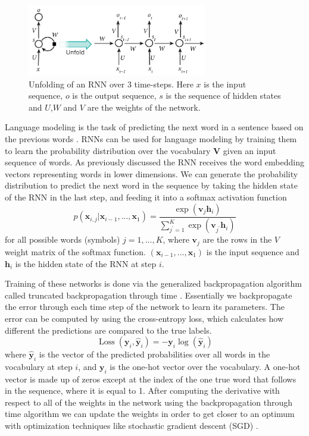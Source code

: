 \documentclass[12pt]{article}
\DeclareMathOperator{\Loss}{Loss}
\begin{document}
\begin{figure}[H]
	\centering
	\includegraphics[width=0.7\textwidth]{pics/rnn.jpg}
	\caption{Unfolding of an RNN over 3 time-steps. Here \(x\) is the input sequence, \(o\) is the output sequence, \(s\) is the sequence of hidden states and \(U\),\(W\) and \(V\) are the weights of the network. \cite{RNN_pic:2017}}
	\label{fig:231}
\end{figure}

Language modeling is the task of predicting the next word in a sentence based on the previous words \cite{Bengio:2003}. RNNs can be used for language modeling by training them to learn the probability distribution over the vocabulary \(\bm{V}\) given an input sequence of words. As previously discussed the RNN receives the word embedding vectors representing words in lower dimensions. We can generate the probability distribution to predict the next word in the sequence by taking the hidden state of the RNN in the last step, and feeding it into a softmax activation function
\begin{equation} \label{eq231b}
p(\bm{x}_{i,j}|\bm{x}_{i-1},...,\bm{x}_1)=\frac{\exp(\bm{v}_j\bm{h}_i)}{\sum_{j^{'}=1}^{K}\exp(\bm{v}_{j^{'}}\bm{h}_i)}
\end{equation}
for all possible words (symbols) \(j=1,...,K\), where \(\bm{v}_j\) are the rows in the \(V\) weight matrix of the softmax function. \((\bm{x}_{i-1},...,\bm{x}_1)\) is the input sequence and \(\bm{h}_i\) is the hidden state of the RNN at step \(i\).

Training of these networks is done via the generalized backpropagation algorithm called truncated backpropagation through time \cite{Werbos:1990,RNN:1988}. Essentially we backpropagate the error through each time step of the network to learn its parameters. The error can be computed by using the cross-entropy loss, which calculates how different the predictions are compared to the true labels.
\begin{equation} \label{eq231c}
\Loss(\bm{y}_i,\bm{\hat{y}}_{i})=-\bm{y}_i \log(\bm{\hat{y}}_{i})
\end{equation}
where \(\bm{\hat{y}}_{i}\) is the vector of the predicted probabilities over all words in the vocabulary at step \(i\), and \(\bm{y}_i\) is the one-hot vector over the vocabulary. A one-hot vector is made up of zeros except at the index of the one true word that follows in the sequence, where it is equal to 1. After computing the derivative with respect to all of the weights in the network using the backpropagation through time algorithm we can update the weights in order to get closer to an optimum with optimization techniques like stochastic gradient descent (SGD) \cite{SGD:2010}. 
\end{document}
